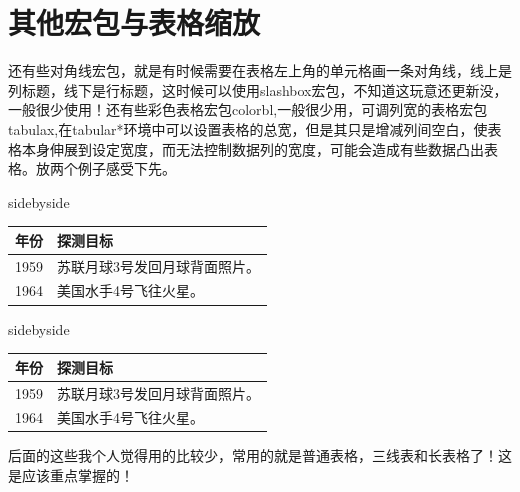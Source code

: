 \documentclass[cn,chinese,color=cyan]{elegantbook}
\begin{document}
\section{其他宏包与表格缩放}
还有些对角线宏包，就是有时候需要在表格左上角的单元格画一条对角线，线上是列标题，线下是行标题，这时候可以使用slashbox宏包，不知道这玩意还更新没，一般很少使用！还有些彩色表格宏包colorbl,一般很少用，可调列宽的表格宏包tabulax,在tabular*环境中可以设置表格的总宽，但是其只是增减列间空白，使表格本身伸展到设定宽度，而无法控制数据列的宽度，可能会造成有些数据凸出表格。放两个例子感受下先。
\begin{tcblisting}{sidebyside}
\begin{tabular*}{50mm}{ll}\hline
年份 & 探测目标 \\ \hline 
1959 & 苏联月球3号发回月球背面照片。\\
1964 & 美国水手4号飞往火星。 \\ \hline 
\end{tabular*}
\end{tcblisting}
\begin{tcblisting}{sidebyside}
\begin{tabularx}{50mm}{lX}\hline
年份 & 探测目标 \\ \hline 
1959 & 苏联月球3号发回月球背面照片。\\
1964 & 美国水手4号飞往火星。 \\ \hline 
\end{tabularx}
\end{tcblisting}
\begin{note}
	后面的这些我个人觉得用的比较少，常用的就是普通表格，三线表和长表格了！这是应该重点掌握的！
\end{note}
\end{document}
